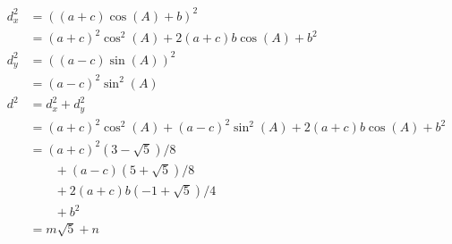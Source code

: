 \begin{align*}
d_x^2 &= ( (a + c)\cos(A) + b)^2 \\
      &= (a + c)^2\cos^2(A) + 2(a + c)b\cos(A) + b^2 \\
d_y^2 &= ( (a - c)\sin(A))^2 \\
      &= (a - c)^2\sin^2(A) \\

d^2 &= d_x^2 + d_y^2 \\
    &= (a + c)^2\cos^2(A)
    + (a - c)^2\sin^2(A)
    + 2(a + c)b\cos(A)
    + b^2 \\
    &= (a + c)^2(3 - \sqrt{5})/8 \\
    &\qquad + (a - c)(5 + \sqrt{5})/8 \\
    &\qquad + 2(a + c)b(-1 + \sqrt{5})/4 \\
    &\qquad + b^2 \\
    &= m\sqrt{5} + n \\

\end{align*}